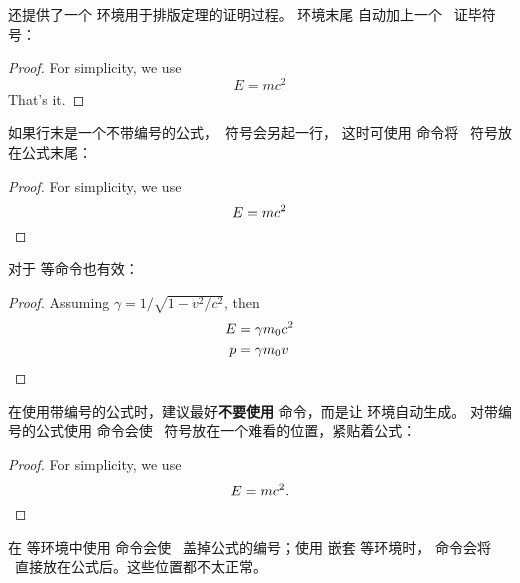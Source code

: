 还提供了一个  环境用于排版定理的证明过程。 环境末尾
自动加上一个 \qedsymbol\ 证毕符号：
\begin{example}
\begin{proof}
For simplicity, we use
\[
E=mc^2
\]
That's it.
\end{proof}
\end{example}

如果行末是一个不带编号的公式，\qedsymbol\ 符号会另起一行，
这时可使用  命令将 \qedsymbol\ 符号放在公式末尾：
\begin{example}
\begin{proof}
For simplicity, we use
\[
E=mc^2 \qedhere
\]
\end{proof}
\end{example}

 对于  等命令也有效：
\begin{example}
\begin{proof}
Assuming $\gamma 
= 1/\sqrt{1-v^2/c^2}$, then
\begin{align*}
E &= \gamma m_0 c^2  \\
p &= \gamma m_0v \qedhere
\end{align*}
\end{proof}
\end{example}

在使用带编号的公式时，建议最好\textbf{不要使用}  命令，而是让  环境自动生成。
对带编号的公式使用  命令会使 \qedsymbol\ 符号放在一个难看的位置，紧贴着公式：
\begin{example}
\begin{proof}
For simplicity, we use
\begin{equation}
E=mc^2.\qedhere
\end{equation}
\end{proof}
\end{example}

在  等环境中使用  命令会使 \qedsymbol\ 盖掉公式的编号；使用  嵌套  等环境时，
 命令会将 \qedsymbol\ 直接放在公式后。这些位置都不太正常。

\endinput